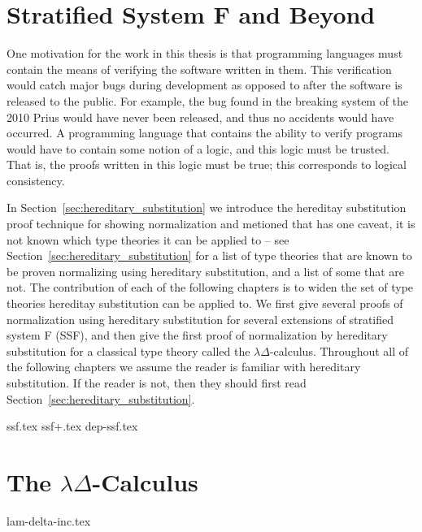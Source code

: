 \documentclass[phd,appendix,dedicationpage,ackpage,epigraphpage,figures]{uithesis}
\begin{document}
\chapter{Stratified System F and Beyond}
\label{chap:stratified_system_f_and_beyond}
One motivation for the work in this thesis is that programming
languages must contain the means of verifying the software written in
them.  This verification would catch major bugs during development as
opposed to after the software is released to the public.  For example,
the bug found in the breaking system of the 2010 Prius would have
never been released, and thus no accidents would have occurred.  A
programming language that contains the ability to verify programs
would have to contain some notion of a logic, and this logic must be
trusted.  That is, the proofs written in this logic must be true; this
corresponds to logical consistency.

In Section~\ref{sec:hereditary_substitution} we introduce the
hereditay substitution proof technique for showing normalization and
metioned that has one caveat, it is not known which type theories it
can be applied to -- see Section~\ref{sec:hereditary_substitution} for
a list of type theories that are known to be proven normalizing using
hereditary substitution, and a list of some that are not.  The
contribution of each of the following chapters is to widen the set of
type theories hereditay substitution can be applied to.  We first give
several proofs of normalization using hereditary substitution for
several extensions of stratified system F (SSF), and then give the
first proof of normalization by hereditary substitution for a
classical type theory called the $\lambda\Delta$-calculus.  Throughout
all of the following chapters we assume the reader is familiar with
hereditary substitution.  If the reader is not, then they should first
read Section~\ref{sec:hereditary_substitution}.

{ssf.tex}
{ssf+.tex}
{dep-ssf.tex}

\chapter{The $\lambda\Delta$-Calculus}
\label{chap:the_lambdadelta-calculus}
{lam-delta-inc.tex}
\end{document}
